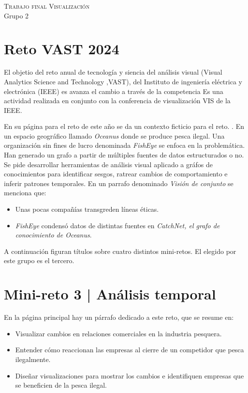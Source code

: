 \documentclass[11pt,spanish,a4paper]{article}
\begin{document}
\begin{center}
  \textsc{\large Trabajo final Visualización}\\
	Grupo 2
\end{center}

\section{Reto VAST 2024}
El objetio del reto anual de tecnología y siencia del análisis visual (Visual Analytics Science and Technology ,VAST), del Instituto de ingeniería eléctrica y electrónica (IEEE) es avanza el cambio a través de la competencia 
Es una actividad realizada en conjunto con la conferencia de visualización VIS de la IEEE.

En su página para el reto de este año se da un contexto ficticio para el reto.
 \cite{noauthor_vast_nodate}.
En un espacio geográfico llamado \emph{Oceanus} donde se produce pesca ilegal.
Una organización sin fines de lucro denominada \emph{FishEye} se enfoca en la problemática.
Han generado un grafo a partir de múltiples fuentes de datos estructurados o no.
Se pide desarrollar herramientas de análisis visual aplicado a gráfos de conocimientos para identificar sesgos, ratrear cambios de comportamiento e inferir patrones temporales.
En un parrafo denominado \emph{Visión de conjunto} se menciona que:
\begin{itemize}
	\item Unas pocas compañías transgreden líneas éticas.
	\item \emph{FishEye} condensó datos de distintas fuentes en \emph{CatchNet, el grafo de conocimiento de Oceanus}.
\end{itemize}

A continuación figuran títulos sobre cuatro distintos mini-retos.
El elegido por este grupo es el tercero.

\section{Mini-reto 3 | Análisis temporal}
En la página principal hay un párrafo dedicado a este reto, que se resume en:
\begin{itemize}
	\item Visualizar cambios en relaciones comerciales en la industria pesquera.
	\item Entender cómo reaccionan las empresas al cierre de un competidor que pesca ilegalmente.
	\item Diseñar visualizaciones para mostrar los cambios e identifiquen empresas que se beneficien de la pesca ilegal.
\end{itemize}
\end{document}
